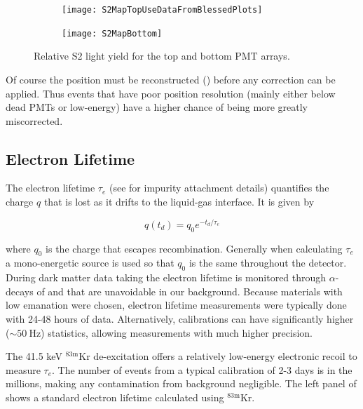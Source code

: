 {\begin{figure}
    \centering
    \begin{subfigure}[t]{0.45\textwidth}
        \centering
        \texttt{[image: S2MapTopUseDataFromBlessedPlots]}
    \end{subfigure}%
    \begin{subfigure}[t]{0.45\textwidth}
        \centering
        \texttt{[image: S2MapBottom]}
    \end{subfigure}
    \caption{Relative S2 light yield for the top and bottom PMT arrays.}
	\label{fig:calibrations_s2_maps}
\end{figure}

Of course the position must be reconstructed () before any correction can be
applied.  Thus events that have poor position resolution (mainly either below dead PMTs or low-energy) have a higher chance of being
more greatly miscorrected.



\subsection{Electron Lifetime}
\label{subsec:det_char_elifetime}
The electron lifetime $\tau_e$ (see  for impurity attachment details) quantifies the charge $q$ that
is lost as it drifts to the liquid-gas interface.  It is given by

\begin{equation}
q(t_d) = q_0 e^{-t_d / \tau_e}
\label{eq:det_char_elifetime}
\end{equation}

\noindent where $q_0$ is the charge that escapes recombination.  Generally when calculating $\tau_e$ a mono-energetic source is used so
that $q_0$ is the same throughout the detector.  During dark matter data taking the electron lifetime is monitored through
$\alpha$-decays of  and  that are unavoidable in our background.  Because materials with low 
emanation were chosen, electron lifetime measurements were typically done with 24-48 hours of data.  Alternatively, calibrations can
have significantly higher (${\sim}50\ \mathrm{Hz}$) statistics, allowing measurements with much higher precision.

The 41.5 keV $\mathrm{^{83m}Kr}$ de-excitation offers a relatively low-energy electronic recoil to measure $\tau_e$.  The number of events
from a typical calibration of 2-3 days is in the millions, making any contamination from background negligible.  The left panel of
 shows a standard electron lifetime calculated using $\mathrm{^{83m}Kr}$.

}
